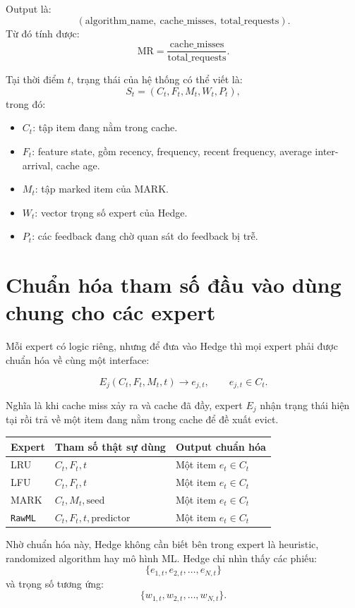 \documentclass[11pt,a4paper]{article}
\newcommand{\code}[1]{\texttt{#1}}
\newcommand{\rawml}{\code{RawML}}
\newcommand{\mr}{\mathrm{MR}}
\begin{document}
Output là:
\[
    (\text{algorithm\_name},\ \text{cache\_misses},\ \text{total\_requests}).
\]
Từ đó tính được:
\[
    \mr = \frac{\text{cache\_misses}}{\text{total\_requests}}.
\]

Tại thời điểm \(t\), trạng thái của hệ thống có thể viết là:
\[
    S_t = (C_t, F_t, M_t, W_t, P_t),
\]
trong đó:

\begin{itemize}[leftmargin=1.4em]
    \item \(C_t\): tập item đang nằm trong cache.
    \item \(F_t\): feature state, gồm recency, frequency, recent frequency, average inter-arrival, cache age.
    \item \(M_t\): tập marked item của MARK.
    \item \(W_t\): vector trọng số expert của Hedge.
    \item \(P_t\): các feedback đang chờ quan sát do feedback bị trễ.
\end{itemize}

\section{Chuẩn hóa tham số đầu vào dùng chung cho các expert}

Mỗi expert có logic riêng, nhưng để đưa vào Hedge thì mọi expert phải được chuẩn hóa về cùng một interface:

\[
    E_j(C_t,F_t,M_t,t) \rightarrow e_{j,t}, \qquad e_{j,t}\in C_t.
\]

Nghĩa là khi cache miss xảy ra và cache đã đầy, expert \(E_j\) nhận trạng thái hiện tại rồi trả về một item đang nằm trong cache để đề xuất evict.

\begin{center}
\begin{tabular}{lll}
\toprule
Expert & Tham số thật sự dùng & Output chuẩn hóa \\
\midrule
LRU & \(C_t,F_t,t\) & Một item \(e_t\in C_t\) \\
LFU & \(C_t,F_t,t\) & Một item \(e_t\in C_t\) \\
MARK & \(C_t,M_t,\text{seed}\) & Một item \(e_t\in C_t\) \\
\rawml{} & \(C_t,F_t,t,\text{predictor}\) & Một item \(e_t\in C_t\) \\
\bottomrule
\end{tabular}
\end{center}

Nhờ chuẩn hóa này, Hedge không cần biết bên trong expert là heuristic, randomized algorithm hay mô hình ML. Hedge chỉ nhìn thấy các phiếu:
\[
    \{e_{1,t},e_{2,t},\ldots,e_{N,t}\}
\]
và trọng số tương ứng:
\[
    \{w_{1,t},w_{2,t},\ldots,w_{N,t}\}.
\]
\end{document}
